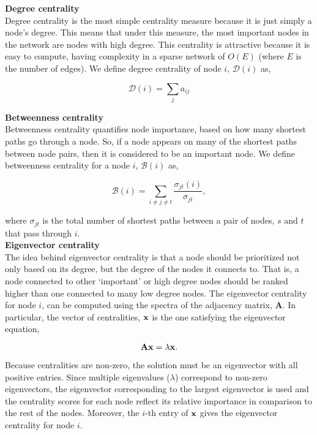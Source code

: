 {\bf Degree centrality}\\
Degree centrality is the most simple centrality measure because it is just simply a node's degree. This means that under this measure, the most important nodes in the network are nodes with high degree. This centrality is attractive because it is easy to compute, having complexity in a sparse network of $O(E)$ (where $E$ is the number of edges). We define degree centrality of node $i$, $\mathcal{D}(i)$ as,

\begin{equation}
\mathcal{D}(i)=\sum_{j}a_{ij}
\end{equation}

{\bf Betweenness centrality}\\
Betweenness centrality quantifies node importance, based on how many shortest paths go through a node. So, if a node appears on many of the shortest paths between node pairs, then it is considered to be an important node. We define betweenness centrality for a node $i$, $\mathcal{B}(i)$ as,

\begin{equation}
\mathcal{B}(i)=\sum_{i\ne j\ne t} \frac{\sigma_{jt}(i)}{\sigma_{jt}},
\end{equation}

where $\sigma_{jt}$ is the total number of shortest paths between a pair of nodes, $s$ and $t$ that pass through $i$. \\

{\bf Eigenvector centrality}\\
The idea behind eigenvector centrality is that a node should be prioritized not only based on its degree, but the degree of the nodes it connects to. That is, a node connected to other `important' or high degree nodes should be ranked higher than one connected to many low degree nodes. The eigenvector centrality for node $i$, can be computed using the spectra of the adjacency matrix, ${\boldsymbol A}$. In particular, the vector of centralities, ${\bf x}$ is the one satisfying the eigenvector equation,

\begin{equation}
{\bf A}{\bf x}=\lambda{\bf x}.
\end{equation}

Because centralities are non-zero, the solution must be an eigenvector with all positive entries. Since multiple eigenvalues ($\lambda$) correspond to non-zero eigenvectors, the eigenvector corresponding to the largest eigenvector is used and the centrality scores for each node reflect its relative importance in comparison to the rest of the nodes. Moreover, the $i$-th entry of ${\bf x}$ gives the eigenvector centrality for node $i$. \\

